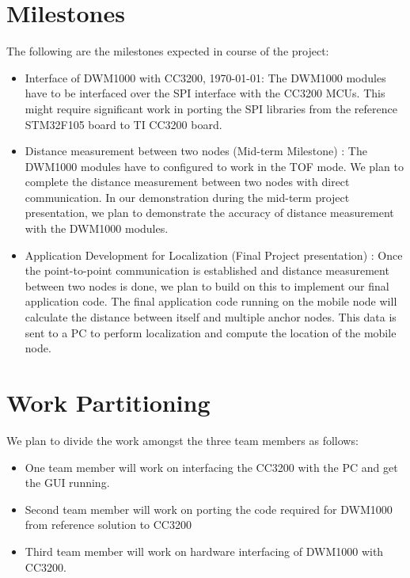 \documentclass[journal,transmag]{IEEEtran}
\begin{document}
\section{Milestones}
The following are the milestones expected in course of the project:
\begin{itemize}
    \item Interface of DWM1000 with CC3200, \today : The DWM1000 modules have to be interfaced over the SPI interface with the CC3200 MCUs. This might require significant work in porting the SPI libraries from the reference STM32F105 board to TI CC3200 board.
    \item Distance measurement between two nodes (Mid-term Milestone) : The DWM1000 modules have to configured to work in the TOF mode. We plan to complete the distance measurement between two nodes with direct communication. In our demonstration during the mid-term project presentation, we plan to demonstrate the accuracy of distance measurement with the DWM1000 modules.
    \item Application Development for Localization (Final Project presentation) : Once the point-to-point communication is established and distance measurement between two nodes is done, we plan to build on this to implement our final application code. The final application code running on the mobile node will calculate the distance between itself and multiple anchor nodes. This data is sent to a PC to perform localization and compute the location of the mobile node. 

\end{itemize}
\section{Work Partitioning}
We plan to divide the work amongst the three team members as follows:
\begin{itemize}
    \item One team member will work on interfacing the CC3200 with the PC and get the GUI running. 
    \item Second team member will work on porting the code required for DWM1000 from reference solution to CC3200
    \item Third team member will work on hardware interfacing of DWM1000 with CC3200.
\end{itemize}
\end{document}
